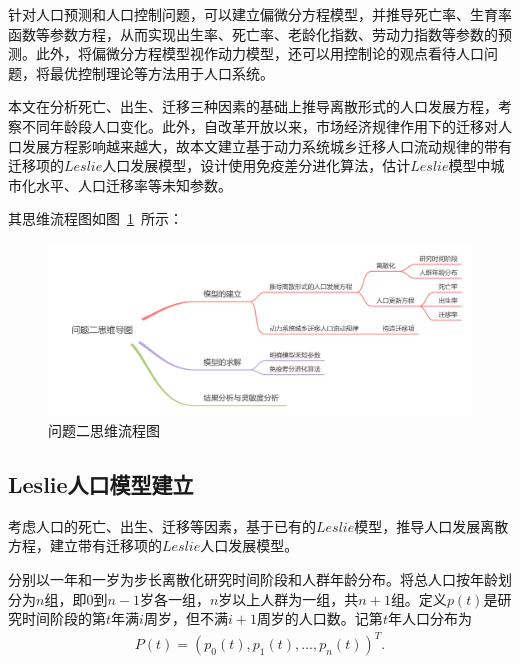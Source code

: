 \documentclass{whutmod}
\begin{document}
		针对人口预测和人口控制问题，可以建立偏微分方程模型，并推导死亡率、生育率函数等参数方程，从而实现出生率、死亡率、老龄化指数、劳动力指数等参数的预测。此外，将偏微分方程模型视作动力模型，还可以用控制论的观点看待人口问题，将最优控制理论等方法用于人口系统。
		
		本文在分析死亡、出生、迁移三种因素的基础上推导离散形式的人口发展方程，考察不同年龄段人口变化。此外，自改革开放以来，市场经济规律作用下的迁移对人口发展方程影响越来越大，故本文建立基于动力系统城乡迁移人口流动规律的带有迁移项的$Leslie$人口发展模型，设计使用免疫差分进化算法，估计$Leslie$模型中城市化水平、人口迁移率等未知参数。
			
			
    	其思维流程图如图~\ref{lssssct}~所示：

			\begin{figure}[H]
				\centering
				\includegraphics[width=\textwidth]{figures/kkks.png}
				\caption{问题二思维流程图}\label{lssssct}
			\end{figure}

		\subsection{Leslie人口模型建立}
		
		考虑人口的死亡、出生、迁移等因素，基于已有的$Leslie$模型，推导人口发展离散方程，建立带有迁移项的$Leslie$人口发展模型。
		
		分别以一年和一岁为步长离散化研究时间阶段和人群年龄分布。将总人口按年龄划分为$n$组，即$0$到$n-1$岁各一组，$n$岁以上人群为一组，共$n+1$组。定义$p(t)$是研究时间阶段的第$t$年满$i$周岁，但不满$i+1$周岁的人口数。记第$t$年人口分布为
		\begin{gather}
		P(t)=(p_0(t),p_1(t),...,p_{n}(t))^T.
		\end{gather}
		
\end{document}
